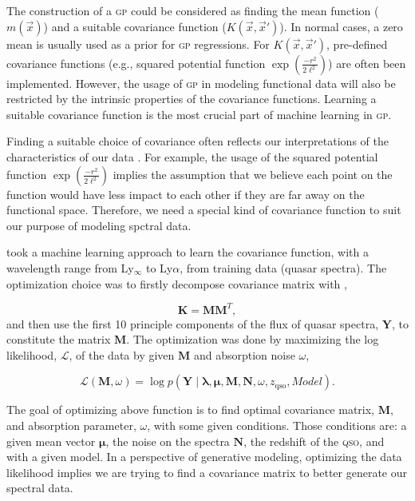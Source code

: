 \documentclass{ar-1col}
\begin{document}
The construction of a \textsc{gp} could be considered as finding the mean function ($m(\vec x)$) and a suitable covariance function ($K(\vec x, \vec x')$). 
In normal cases, a zero mean is usually used as a prior for \textsc{gp} regressions. For $K(\vec x, \vec x')$, pre-defined covariance functions (e.g., squared potential function $\exp{(\frac{-r^2}{2 \ell^2})}$) are often been implemented. 
However, the usage of \textsc{gp} in modeling functional data will also be restricted by the intrinsic properties of the covariance functions.
Learning a suitable covariance function is the most crucial part of machine learning in \textsc{gp}.

Finding a suitable choice of covariance often reflects our interpretations of the characteristics of our data  \citep{Rasmussen2005}. 
For example, the usage of the squared potential function $\exp{(\frac{-r^2}{2 \ell^2})}$ implies the assumption that we believe each point on the function would have less impact to each other if they are far away on the functional space.
Therefore, we need a special kind of covariance function to suit our purpose of modeling spctral data.

\citet{Garnett17} took a machine learning approach to learn the covariance function, with a wavelength range from Ly$_\infty$ to Ly$\alpha$, from training data (quasar spectra). 
The optimization choice was to firstly decompose covariance matrix with \citep{Garnett2015},

\begin{equation}
    \mathbf{K} = \mathbf{M}\mathbf{M}^{T},
    \label{eq:decompose}
\end{equation}
and then use the first 10 principle components of the flux of quasar spectra, $\mathbf{Y}$, to constitute the matrix $\mathbf{M}$. 
The optimization was done by maximizing the log likelihood, $\mathcal{L}$, of the data by given $\mathbf{M}$ and absorption noise $\omega$, 

\begin{equation}
    \mathcal{L}(\mathbf{M}, \omega) = \log{ p(\mathbf{Y} \mid \mathbf{\lambda}, \mathbf{\mu}, \mathbf{M}, \mathbf{N}, \omega, z_\mathrm{qso}, Model) }.
\end{equation}

The goal of optimizing above function is to find optimal covariance matrix, $\mathbf{M}$, and absorption parameter, $\omega$, with some given conditions. Those conditions are: a given mean vector $\mathbf{\mu}$, the noise on the spectra $\mathbf{N}$, the redshift of the \textsc{qso}, and with a given model. 
In a perspective of generative modeling, optimizing the data likelihood implies we are trying to find a covariance matrix to better generate our spectral data. 
\end{document}

